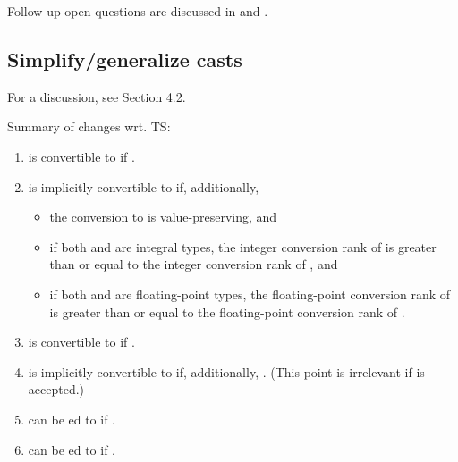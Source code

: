 Follow-up open questions are discussed in  and .

\subsection{Simplify/generalize casts}\label{sec:casts}

For a discussion, see  Section 4.2.

Summary of changes wrt. TS:
\begin{enumerate}
  \item {} is convertible to  if
    .

  \item {} is implicitly convertible to 
    if, additionally,
    \begin{itemize}
      \item the conversion  to  is value-preserving, and
      \item if both  and  are integral types, the integer
        conversion rank of  is greater than or equal to the integer
        conversion rank of , and
      \item if both  and  are floating-point types, the
        floating-point conversion rank of  is greater than or equal to
        the floating-point conversion rank of .
    \end{itemize}


  \item {} is convertible to  if
    .

  \item {} is implicitly convertible to
     if, additionally, .
    (This point is irrelevant if  is accepted.)

  \item {} can be ed to  if
    .

  \item {} can be ed to  if
    .
\end{enumerate}

